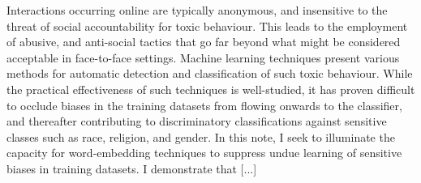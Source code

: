 Interactions occurring online are typically anonymous, and insensitive to the threat of social accountability for toxic behaviour. This leads to the employment of abusive, and anti-social tactics that go far beyond what might be considered acceptable in face-to-face settings. Machine learning techniques present various methods for automatic detection and classification of such toxic behaviour. While the practical effectiveness of such techniques is well-studied, it has proven difficult to occlude biases in the training datasets from flowing onwards to the classifier, and thereafter contributing to discriminatory classifications against sensitive classes such as race, religion, and gender. In this note, I seek to illuminate the capacity for word-embedding techniques to suppress undue learning of sensitive biases in training datasets. I demonstrate that [...]

